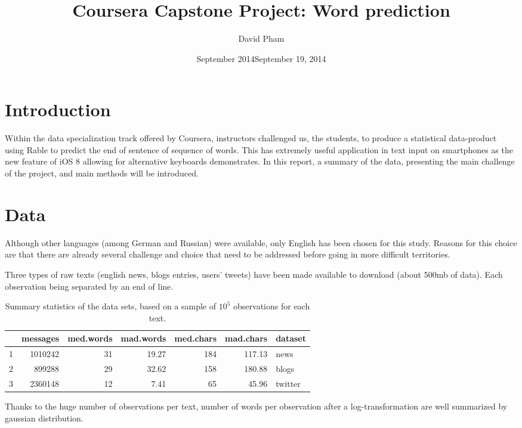 \documentclass[a4paper]{article}
\title{Coursera Capstone Project: Word prediction }
\author{David Pham}
\date{September 2014}
\date{September 19, 2014} %
\newcommand{\R}{\textsf{R}}
\begin{document}
\maketitle

\section{Introduction}
Within the data specialization track offered by Coursera, instructors challenged
us, the students, to produce a statistical data-product  using \R able to
predict the end of sentence of sequence of words. This has extremely useful
application in text input on smartphones as the new feature of iOS 8 allowing
for alternative keyboards  demonstrates. 
In this report, a summary of the data, presenting the main challenge of the
project, and main methods will be introduced.

\section{Data}
Although other languages (among German and Russian) were available, only English
has been chosen for this study. Reasons for this choice are that there are
already several challenge and choice that need to be addressed before going in
more difficult territories.

Three types of raw texts (english news, blogs entries, users' tweets) have been
made available to download (about 500mb of data). Each observation being
separated by an end of line. 

\begin{table}
{\small
\centering
\begin{tabular}{rrrrrrl}
  \hline
 & messages & med.words & mad.words & med.chars & mad.chars & dataset \\ 
  \hline
1 & 1010242 & 31 & 19.27 & 184 & 117.13 & news \\ 
  2 & 899288 & 29 & 32.62 & 158 & 180.88 & blogs \\ 
  3 & 2360148 & 12 & 7.41 & 65 & 45.96 & twitter \\ 
   \hline
\end{tabular}
\caption{Summary statistics of the data sets, based on a sample of $10^5$
   observations for each text.}
}
\end{table}

Thanks to the huge number of observations per text, number of words per
observation after a log-transformation are well summarized by gaussian
distribution.
\end{document}
